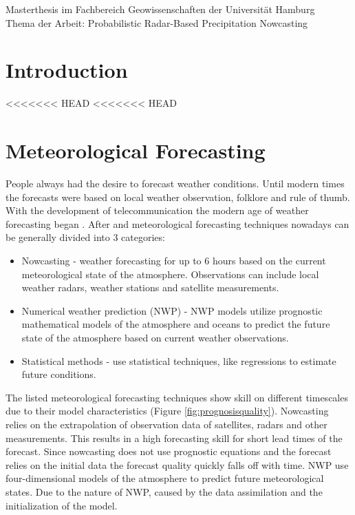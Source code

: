 \documentclass[11pt,twoside,a4paper,fleqn,x11names]{report}
\numberwithin{equation}{chapter}
\numberwithin{figure}{chapter}
\numberwithin{table}{chapter}
\begin{document}
	\newpage
	\thispagestyle{empty}
	\null
	\vfill
	Masterthesis im Fachbereich Geowissenschaften der Universität Hamburg\\
	Thema der Arbeit: \glqq Probabilistic Radar-Based Precipitation Nowcasting\grqq
	
	
\newpage
\renewcommand{\abstractname}{\huge \flushleft Abstract}
\begin{abstract}
\null
\end{abstract}
\thispagestyle{empty}
\pagestyle{empty}
\tableofcontents
\listoffigures
\listoftables
\newpage\pagestyle{fancy}
\chapter{Introduction}
<<<<<<< HEAD
<<<<<<< HEAD
\chapter{Meteorological Forecasting}
People always had the desire to forecast weather conditions. Until modern times the forecasts were based on local weather observation, folklore and rule of thumb. With the development of telecommunication the modern age of weather forecasting began \citep{Moore}. After \cite{Sene2009} and \cite{Pierce12} meteorological forecasting techniques nowadays can be generally divided into 3 categories:
\begin{itemize}
	\item Nowcasting - weather forecasting for up to 6 hours based on the current meteorological state of the atmosphere. Observations can include local weather radars, weather stations and satellite measurements.
	\item Numerical weather prediction (NWP) - NWP models utilize prognostic mathematical models of the atmosphere and oceans to predict the future state of the atmosphere based on current weather observations.
	\item Statistical methods - use statistical techniques, like regressions to estimate future conditions.
\end{itemize}
The listed meteorological forecasting techniques show skill on different timescales due to their model characteristics (Figure \ref{fig:prognosisquality}). Nowcasting relies on the extrapolation of observation data of satellites, radars and other measurements. This results in a high forecasting skill for short lead times of the forecast. Since nowcasting does not use prognostic equations and the forecast relies on the initial data the forecast quality quickly falls off with time. NWP use four-dimensional models of the atmosphere to predict future meteorological states. Due to the nature of NWP, caused by the data assimilation and the initialization of the model.
\end{document}
